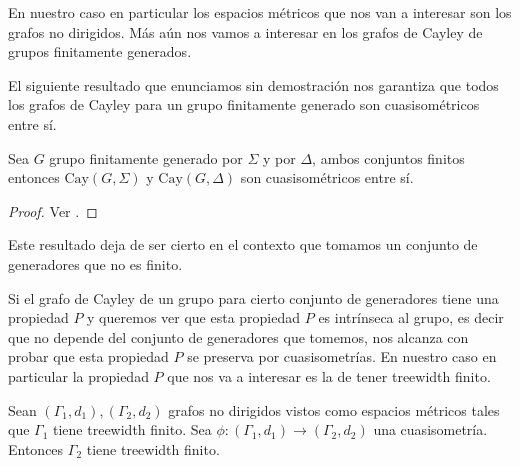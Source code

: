 \documentclass[tesis.tex]{subfiles}
\begin{document}
En nuestro caso en particular los espacios métricos que nos van a interesar son los grafos no dirigidos.
Más aún nos vamos a interesar en los grafos de Cayley de grupos finitamente generados.

El siguiente resultado que enunciamos sin demostración nos garantiza que todos los grafos de Cayley para un grupo finitamente generado son cuasisométricos entre sí.
\begin{prop}
	Sea $G$ grupo finitamente generado por $\Sigma$ y por $\Delta$, ambos conjuntos finitos entonces $\text{Cay}(G,\Sigma)$ y $\text{Cay}(G, \Delta)$ son cuasisométricos entre sí.
\end{prop}

\begin{proof}
	Ver \cite{bridson2013metric}.
\end{proof}

Este resultado deja de ser cierto en el contexto que tomamos un conjunto de generadores que no es finito.


Si el grafo de Cayley de un grupo para cierto conjunto de generadores tiene una propiedad $P$ y queremos ver que esta propiedad $P$ es intrínseca al grupo, es decir que no depende del conjunto de generadores que tomemos, nos alcanza con probar que esta propiedad $P$ se preserva por cuasisometrías.
En nuestro caso en particular la propiedad $P$ que nos va a interesar es la de tener treewidth finito.


\begin{prop} \label{treewidth-inv}
	Sean $(\Gamma_{1},d_{1}), (\Gamma_{2}, d_{2})$ grafos no dirigidos vistos como espacios métricos tales que $\Gamma_{1}$ tiene treewidth finito.
	Sea $\phi:(\Gamma_{1},d_{1})\to (\Gamma_{2},d_{2})$ una cuasisometría.
	Entonces $\Gamma_{2}$ tiene treewidth finito.
\end{prop}
\end{document}
